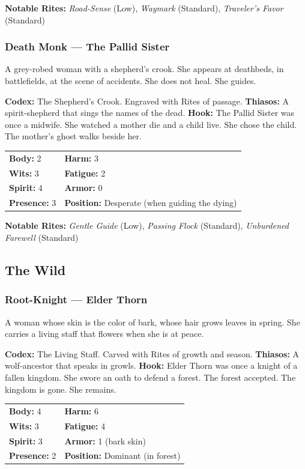 \textbf{Notable Rites:} \textit{Road-Sense} (Low), \textit{Waymark} (Standard), \textit{Traveler's Favor} (Standard)

\subsubsection{Death Monk — The Pallid Sister}

A grey-robed woman with a shepherd's crook. She appears at deathbeds, in battlefields, at the scene of accidents. She does not heal. She guides.

\textbf{Codex:} The Shepherd's Crook. Engraved with Rites of passage.
\textbf{Thiasos:} A spirit-shepherd that sings the names of the dead.
\textbf{Hook:} The Pallid Sister was once a midwife. She watched a mother die and a child live. She chose the child. The mother's ghost walks beside her.

\begin{tabular}{ll}
\textbf{Body:} 2 & \textbf{Harm:} 3 \\
\textbf{Wits:} 3 & \textbf{Fatigue:} 2 \\
\textbf{Spirit:} 4 & \textbf{Armor:} 0 \\
\textbf{Presence:} 3 & \textbf{Position:} Desperate (when guiding the dying) \\
\end{tabular}

\textbf{Notable Rites:} \textit{Gentle Guide} (Low), \textit{Passing Flock} (Standard), \textit{Unburdened Farewell} (Standard)

\subsection{The Wild}

\subsubsection{Root-Knight — Elder Thorn}

A woman whose skin is the color of bark, whose hair grows leaves in spring. She carries a living staff that flowers when she is at peace.

\textbf{Codex:} The Living Staff. Carved with Rites of growth and season.
\textbf{Thiasos:} A wolf-ancestor that speaks in growls.
\textbf{Hook:} Elder Thorn was once a knight of a fallen kingdom. She swore an oath to defend a forest. The forest accepted. The kingdom is gone. She remains.

\begin{tabular}{ll}
\textbf{Body:} 4 & \textbf{Harm:} 6 \\
\textbf{Wits:} 3 & \textbf{Fatigue:} 4 \\
\textbf{Spirit:} 3 & \textbf{Armor:} 1 (bark skin) \\
\textbf{Presence:} 2 & \textbf{Position:} Dominant (in forest) \\
\end{tabular}

